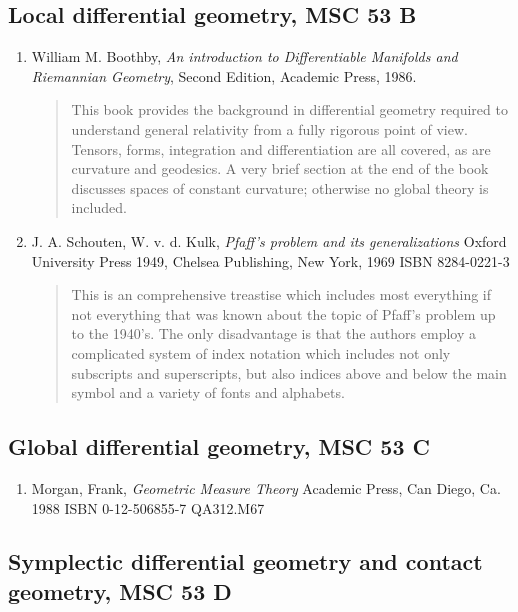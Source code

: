 \documentclass[12pt]{article}
\begin{document}
\subsection*{Local differential geometry, MSC 53 B}
\begin{enumerate}
\item William M. Boothby, \emph{An introduction to Differentiable Manifolds and Riemannian Geometry}, Second Edition, Academic Press, 1986.
\begin{quote}
This book provides the background in differential geometry required to understand general relativity from a fully rigorous point of view.  Tensors, forms, integration and differentiation are all covered, as are curvature and geodesics.  A very brief section at the end of the book discusses spaces of constant curvature; otherwise no global theory is included.
\end{quote}
\item J. A. Schouten, W. v. d. Kulk, \emph{Pfaff's problem and its generalizations} Oxford University Press 1949, Chelsea Publishing, New York, 1969 ISBN 8284-0221-3
\begin{quote}
This is an comprehensive treastise which includes most everything if not everything that was known about the topic of Pfaff's problem up to the 1940's.  The only disadvantage is that the authors employ a complicated system of index notation which includes not only subscripts and superscripts, but also indices above and below the main symbol and a variety of fonts and alphabets.
\end{quote}
\end{enumerate}

\subsection*{Global differential geometry, MSC 53 C}

\begin{enumerate}
\item Morgan, Frank, \emph{Geometric Measure Theory} Academic Press, Can Diego, Ca. 1988 ISBN 0-12-506855-7 QA312.M67
\end{enumerate}


\subsection*{Symplectic differential geometry and contact geometry, MSC 53 D}
\end{document}
